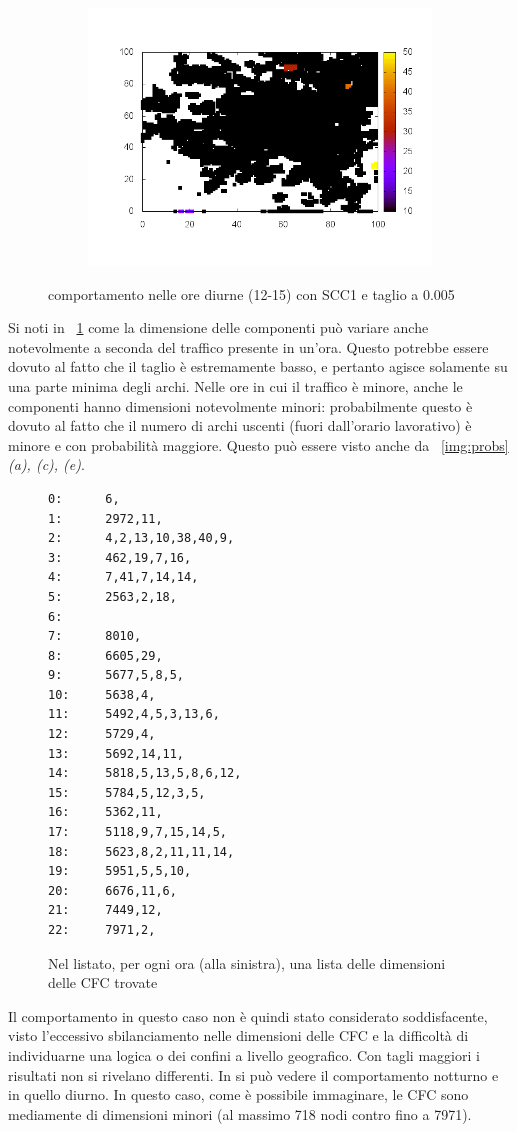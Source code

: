 \documentclass[10pt,a4paper]{article}
\begin{document}
\begin{figure}
\begin{subfigure}[b]{1\textwidth}
\includegraphics[scale=.5]{./img/stampe/scc1/15.png}
\end{subfigure}
\caption{comportamento nelle ore diurne (12-15) con SCC1 e taglio a 0.005}
\end{figure}
Si noti in ~\ref{list:scc1_0-005} come la dimensione delle componenti può variare anche notevolmente a seconda del traffico presente in un'ora. Questo potrebbe essere dovuto al fatto che il taglio è estremamente basso, e pertanto agisce solamente su una parte minima degli archi. Nelle ore in cui il traffico è minore, anche le componenti hanno dimensioni notevolmente minori: probabilmente questo è dovuto al fatto che il numero di archi uscenti (fuori dall'orario lavorativo) è minore e con probabilità maggiore. Questo può essere visto anche da ~\ref{img:probs}\emph{(a), (c), (e)}.
\begin{figure}
\begin{verbatim}
0:      6,
1:      2972,11,
2:      4,2,13,10,38,40,9,
3:      462,19,7,16,
4:      7,41,7,14,14,
5:      2563,2,18,
6:
7:      8010,
8:      6605,29,
9:      5677,5,8,5,
10:     5638,4,
11:     5492,4,5,3,13,6,
12:     5729,4,
13:     5692,14,11,
14:     5818,5,13,5,8,6,12,
15:     5784,5,12,3,5,
16:     5362,11,
17:     5118,9,7,15,14,5,
18:     5623,8,2,11,11,14,
19:     5951,5,5,10,
20:     6676,11,6,
21:     7449,12,
22:     7971,2,
\end{verbatim}
\caption{Nel listato, per ogni ora (alla sinistra), una lista delle dimensioni delle CFC trovate}
\label{list:scc1_0-005}
\end{figure}
Il comportamento in questo caso non è quindi stato considerato soddisfacente, visto l'eccessivo sbilanciamento nelle dimensioni delle CFC e la difficoltà di individuarne una logica o dei confini a livello geografico.
Con tagli maggiori i risultati non si rivelano differenti. In \label{scc1_0-05_night} si può vedere il comportamento notturno e in \label{scc1_0-05_day} quello diurno. In questo caso, come è possibile immaginare, le CFC sono mediamente di dimensioni minori (al massimo 718 nodi contro fino a 7971).
\end{document}
